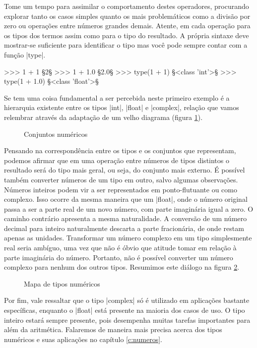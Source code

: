 	Tome um tempo para assimilar o comportamento destes operadores, procurando explorar tanto os casos simples quanto os mais problemáticos como a divisão por zero ou operações entre números grandes demais. Atente, em cada operação para os tipos dos termos assim como para o tipo do resultado. A própria sintaxe deve mostrar-se suficiente para identificar o tipo mas você pode sempre contar com a função |type|.\par
	\begin{pyprompt}
	>>> 1 + 1
	§2§
	>>> 1 + 1.0
	§2.0§
	>>> type(1 + 1)
	§<class 'int'>§
	>>> type(1 + 1.0)
	§<class 'float'>§
	\end{pyprompt}
	Se tem uma coisa fundamental a ser percebida neste primeiro exemplo é a hierarquia existente entre os tipos |int|, |float| e |complex|, relação que vamos relembrar através da adaptação de um velho diagrama (figura \ref{f:conjuntos}).
	\begin{figure}[h]
		\centering
		\medskip
		\caption{Conjuntos numéricos}
		\label{f:conjuntos}
	\end{figure}
	Pensando na correspondência entre os tipos e os conjuntos que representam, podemos afirmar que em uma operação entre números de tipos distintos o resultado será do tipo mais geral, ou seja, do conjunto mais externo. É possível também converter números de um tipo em outro, salvo algumas observações. Números inteiros podem vir a ser representados em ponto-flutuante ou como complexo. Isso ocorre da mesma maneira que um |float|, onde o número original passa a ser a parte real de um novo número, com parte imaginária igual a zero. O caminho contrário apresenta a mesma naturalidade. A conversão de um número decimal para inteiro naturalmente descarta a parte fracionária, de onde restam apenas as unidades. Transformar um número complexo em um tipo simplesmente real seria ambíguo, uma vez que não é óbvio que atitude tomar em relação à parte imaginária do número. Portanto, não é possível converter um número complexo para nenhum dos outros tipos. Resumimos este diálogo na figura \ref{f:mapa-numeros}.
	\begin{figure}[h]
		\centering
		\medskip
		\caption{Mapa de tipos numéricos}
		\label{f:mapa-numeros}
	\end{figure}
	Por fim, vale ressaltar que o tipo |complex| só é utilizado em aplicações bastante específicas, enquanto o |float| está presente na maioria dos casos de uso. O tipo inteiro estará sempre presente, pois desempenha muitas tarefas importantes para além da aritmética. Falaremos de maneira mais precisa acerca dos tipos numéricos e suas aplicações no capítulo \ref{c:numeros}.\par

